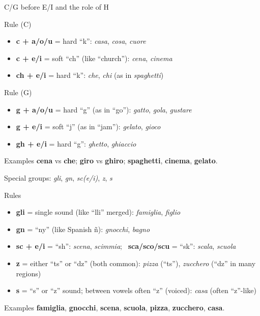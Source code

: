 \blueheader
\begin{frame}{C/G before E/I and the role of H}
\begin{red*}{Rule (C)}
\begin{itemize}
  \item \textbf{c + a/o/u} = hard “k”: \textit{casa}, \textit{cosa}, \textit{cuore}
  \item \textbf{c + e/i} = soft “ch” (like “church”): \textit{cena}, \textit{cinema}
  \item \textbf{ch + e/i} = hard “k”: \textit{che}, \textit{chi} (as in \textit{spaghetti})
\end{itemize}
\end{red*}

\begin{red*}{Rule (G)}
\begin{itemize}
  \item \textbf{g + a/o/u} = hard “g” (as in “go”): \textit{gatto}, \textit{gola}, \textit{gustare}
  \item \textbf{g + e/i} = soft “j” (as in “jam”): \textit{gelato}, \textit{gioco}
  \item \textbf{gh + e/i} = hard “g”: \textit{ghetto}, \textit{ghiaccio}
\end{itemize}
\end{red*}

\begin{green*}{Examples}
\textbf{cena} vs \textbf{che}; \textbf{giro} vs \textbf{ghiro}; \textbf{spaghetti}, \textbf{cinema}, \textbf{gelato}.
\end{green*}
\end{frame}

\blueheader
\begin{frame}{Special groups: \textit{gli}, \textit{gn}, \textit{sc(e/i)}, \textit{z}, \textit{s}}
\begin{red*}{Rules}
\begin{itemize}
  \item \textbf{gli} = single sound (like “lli” merged): \textit{famiglia}, \textit{figlio}
  \item \textbf{gn} = “ny” (like Spanish ñ): \textit{gnocchi}, \textit{bagno}
  \item \textbf{sc + e/i} = “sh”: \textit{scena}, \textit{scimmia}; \ \textbf{sca/sco/scu} = “sk”: \textit{scala}, \textit{scuola}
  \item \textbf{z} = either “ts” or “dz” (both common): \textit{pizza} (“ts”), \textit{zucchero} (“dz” in many regions)
  \item \textbf{s} = “s” or “z” sound; between vowels often “z” (voiced): \textit{casa} (often “z”-like)
\end{itemize}
\end{red*}

\begin{green*}{Examples}
\textbf{famiglia}, \textbf{gnocchi}, \textbf{scena}, \textbf{scuola}, \textbf{pizza}, \textbf{zucchero}, \textbf{casa}.
\end{green*}
\end{frame}


